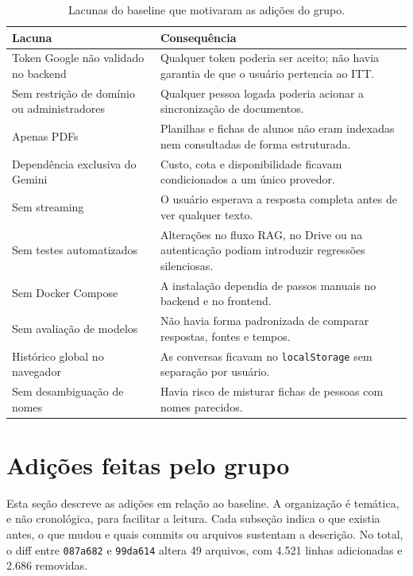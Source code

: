 \documentclass[12pt,a4paper]{article}
\newcommand{\commit}[1]{\texttt{#1}}
\begin{document}
\begin{table}[H]
\centering
\small
\begin{tabularx}{\textwidth}{@{}p{4.6cm} X@{}}
\toprule
Lacuna & Consequência \\
\midrule
Token Google não validado no backend & Qualquer token poderia ser aceito;
não havia garantia de que o usuário pertencia ao ITT. \\
Sem restrição de domínio ou administradores & Qualquer pessoa logada poderia
acionar a sincronização de documentos. \\
Apenas PDFs & Planilhas e fichas de alunos não eram indexadas nem consultadas
de forma estruturada. \\
Dependência exclusiva do Gemini & Custo, cota e disponibilidade ficavam
condicionados a um único provedor. \\
Sem streaming & O usuário esperava a resposta completa antes de ver qualquer
texto. \\
Sem testes automatizados & Alterações no fluxo RAG, no Drive ou na autenticação
podiam introduzir regressões silenciosas. \\
Sem Docker Compose & A instalação dependia de passos manuais no backend e no
frontend. \\
Sem avaliação de modelos & Não havia forma padronizada de comparar respostas,
fontes e tempos. \\
Histórico global no navegador & As conversas ficavam no \texttt{localStorage} sem
separação por usuário. \\
Sem desambiguação de nomes & Havia risco de misturar fichas de pessoas com nomes
parecidos. \\
\bottomrule
\end{tabularx}
\caption{Lacunas do baseline que motivaram as adições do grupo.}
\label{tab:lacunas}
\end{table}

\section{Adições feitas pelo grupo}

Esta seção descreve as adições em relação ao baseline. A organização é temática,
e não cronológica, para facilitar a leitura. Cada subseção indica o que existia
antes, o que mudou e quais commits ou arquivos sustentam a descrição. No total,
o diff entre \commit{087a682} e \commit{99da614} altera 49 arquivos, com 4.521
linhas adicionadas e 2.686 removidas.
\end{document}

